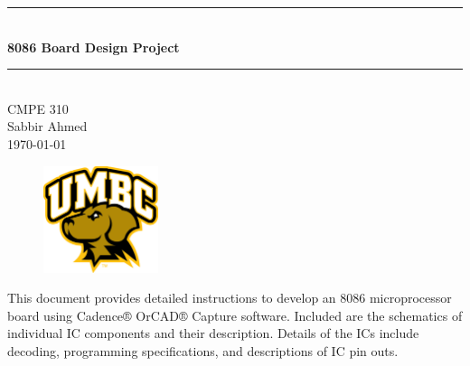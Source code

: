 \begin{titlepage}

    \newcommand{\HRule}{\rule{\linewidth}{0.5mm}}
    \center

    \HRule \\[0.5cm]
    { \huge \bfseries 8086 Board Design Project}\\[0.4cm]
    \HRule \\[1.5cm]

    {\large CMPE 310\\
    Sabbir Ahmed}\\[3cm] %

    {\large \today}\\[2cm]

    \begin{figure}[h]
        \begin{center}
            \includegraphics[width=0.3\textwidth]{figures/uni_logo.jpg}
            \label{fig:uni_logo}
        \end{center}
    \end{figure}

    \vfill %

    \footnotesize This document provides detailed instructions to develop an 8086 microprocessor board using Cadence® OrCAD® Capture software. Included are the schematics of individual IC components and their description. Details of the ICs include decoding, programming specifications, and descriptions of IC pin outs.\\[-1cm]

\end{titlepage}
